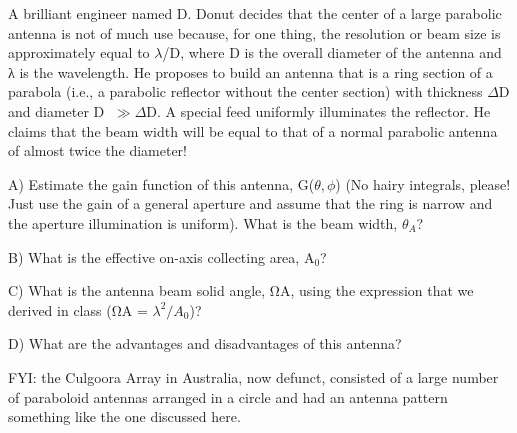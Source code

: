 \documentclass[12pt]{article}
\newenvironment{problem}[2][Problem]{\begin{trivlist}
\item[\hskip \labelsep {\bfseries #1}\hskip \labelsep {\bfseries #2.}]}{\end{trivlist}}
\begin{document}
\bigskip
\bigskip


\begin{problem}{2}
  A brilliant engineer named D. Donut decides that the center of a large parabolic antenna is not of much use because, for one thing, the resolution or beam size is approximately equal to $\lambda$/D, where D is the overall diameter of the antenna and λ is the wavelength. He proposes to build an antenna that is a ring section of a parabola (i.e., a parabolic reflector without the center section) with thickness $\Delta$D and diameter D $\gg \Delta$D. A special feed uniformly illuminates the reflector. He claims that the beam width will be equal to that of a normal parabolic antenna of almost twice the diameter!

  A) Estimate the gain function of this antenna, G($\theta, \phi$) (No hairy integrals, please! Just use the gain of a general aperture and assume that the ring is narrow and the aperture illumination is uniform). What is the beam width, $\theta_A$?

  B) What is the effective on-axis collecting area, A$_0$?

  C) What is the antenna beam solid angle, ΩA, using the expression that we derived in class (ΩA = $\lambda^2/A_0$)?

  D) What are the advantages and disadvantages of this antenna?

  FYI: the Culgoora Array in Australia, now defunct, consisted of a large number of paraboloid antennas arranged in a circle and had an antenna pattern something like the one discussed here.
\end{problem}
\end{document}
